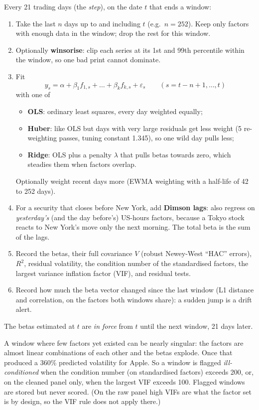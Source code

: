 \documentclass[11pt,a4paper]{article}
\begin{document}
\begin{method}
Every 21 trading days (the \emph{step}), on the date $t$ that ends a window:
\begin{enumerate}[leftmargin=1.4em]
  \item Take the last $n$ days up to and including $t$ (e.g.\ $n=252$). Keep only factors with enough data in the window; drop the rest for this window.
  \item Optionally \textbf{winsorise}: clip each series at its 1st and 99th percentile within the window, so one bad print cannot dominate.
  \item Fit
  \[
    y_s = \alpha + \beta_1 f_{1,s} + \dots + \beta_k f_{k,s} + \varepsilon_s
    \qquad (s = t-n+1, \dots, t)
  \]
  with one of
  \begin{itemize}[leftmargin=1.2em]
    \item \textbf{OLS}: ordinary least squares, every day weighted equally;
    \item \textbf{Huber}: like OLS but days with very large residuals get less weight (5 re-weighting passes, tuning constant 1.345), so one wild day pulls less;
    \item \textbf{Ridge}: OLS plus a penalty $\lambda$ that pulls betas towards zero, which steadies them when factors overlap.
  \end{itemize}
  Optionally weight recent days more (EWMA weighting with a half-life of 42 to 252 days).
  \item For a security that closes before New York, add \textbf{Dimson lags}: also regress on \emph{yesterday's} (and the day before's) US-hours factors, because a Tokyo stock reacts to New York's move only the next morning. The total beta is the sum of the lags.
  \item Record the betas, their full covariance $V$ (robust Newey-West ``HAC'' errors), $R^2$, residual volatility, the condition number of the standardised factors, the largest variance inflation factor (VIF), and residual tests.
  \item Record how much the beta vector changed since the last window (L1 distance and correlation, on the factors both windows share): a sudden jump is a drift alert.
\end{enumerate}
The betas estimated at $t$ are \emph{in force} from $t$ until the next window, 21 days later.
\end{method}

\begin{warn}
A window where few factors yet existed can be nearly singular: the factors are
almost linear combinations of each other and the betas explode. Once that produced a
360\% predicted volatility for Apple. So a window is flagged \emph{ill-conditioned}
when the condition number (on standardised factors) exceeds 200, or, on the cleaned
panel only, when the largest VIF exceeds 100. Flagged windows are stored but never
scored. (On the raw panel high VIFs are what the factor set is by design, so the VIF
rule does not apply there.)
\end{warn}
\end{document}
